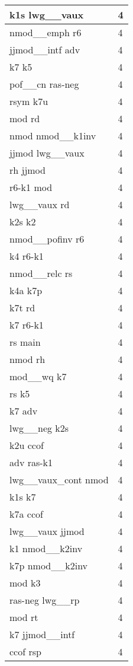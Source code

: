 \documentclass[a4 paper]{article}
\begin{document}
\begin{longtable}{p{}p{}}
k1s lwg\_\_vaux  & 4 \\ \midrule
nmod\_\_emph r6  & 4 \\ \midrule
jjmod\_\_intf adv  & 4 \\ \midrule
k7 k5  & 4 \\ \midrule
pof\_\_cn ras-neg  & 4 \\ \midrule
rsym k7u  & 4 \\ \midrule
mod rd  & 4 \\ \midrule
nmod nmod\_\_k1inv  & 4 \\ \midrule
jjmod lwg\_\_vaux  & 4 \\ \midrule
rh jjmod  & 4 \\ \midrule
r6-k1 mod  & 4 \\ \midrule
lwg\_\_vaux rd  & 4 \\ \midrule
k2s k2  & 4 \\ \midrule
nmod\_\_pofinv r6  & 4 \\ \midrule
k4 r6-k1  & 4 \\ \midrule
nmod\_\_relc rs  & 4 \\ \midrule
k4a k7p  & 4 \\ \midrule
k7t rd  & 4 \\ \midrule
k7 r6-k1  & 4 \\ \midrule
rs main  & 4 \\ \midrule
nmod rh  & 4 \\ \midrule
mod\_\_wq k7  & 4 \\ \midrule
rs k5  & 4 \\ \midrule
k7 adv  & 4 \\ \midrule
lwg\_\_neg k2s  & 4 \\ \midrule
k2u ccof  & 4 \\ \midrule
adv ras-k1  & 4 \\ \midrule
lwg\_\_vaux\_cont nmod  & 4 \\ \midrule
k1s k7  & 4 \\ \midrule
k7a ccof  & 4 \\ \midrule
lwg\_\_vaux jjmod  & 4 \\ \midrule
k1 nmod\_\_k2inv  & 4 \\ \midrule
k7p nmod\_\_k2inv  & 4 \\ \midrule
mod k3  & 4 \\ \midrule
ras-neg lwg\_\_rp  & 4 \\ \midrule
mod rt  & 4 \\ \midrule
k7 jjmod\_\_intf  & 4 \\ \midrule
ccof rsp  & 4 \\ \midrule

\end{longtable}
\end{document}
